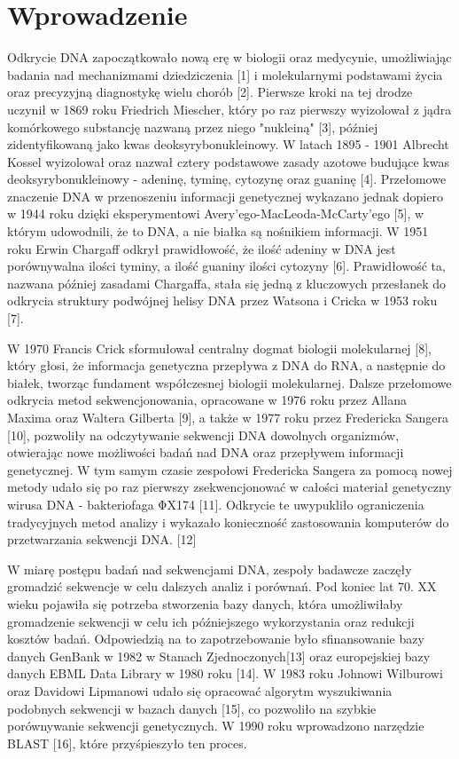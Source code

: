 \clearpage
\section{Wprowadzenie}

Odkrycie DNA zapoczątkowało nową erę w biologii oraz medycynie, umożliwiając badania
nad mechanizmami dziedziczenia [1] i molekularnymi podstawami życia oraz precyzyjną 
diagnostykę wielu chorób [2]. Pierwsze kroki na tej drodze uczynił w 1869 roku 
Friedrich Miescher, który po raz pierwszy wyizolował z jądra komórkowego substancję 
nazwaną przez niego "nukleiną" [3], później zidentyfikowaną jako kwas deoksyrybonukleinowy. 
W latach 1895 - 1901 Albrecht Kossel wyizolował oraz nazwał cztery podstawowe zasady 
azotowe budujące kwas deoksyrybonukleinowy - adeninę, tyminę, cytozynę oraz guaninę [4].
Przełomowe znaczenie DNA w przenoszeniu informacji genetycznej wykazano jednak dopiero 
w 1944 roku dzięki eksperymentowi Avery'ego-MacLeoda-McCarty'ego [5], w którym udowodnili, 
że to DNA, a nie białka są nośnikiem informacji. 
W 1951 roku Erwin Chargaff odkrył prawidłowość, że ilość adeniny w DNA jest porównywalna
ilości tyminy, a ilość guaniny ilości cytozyny [6]. Prawidłowość ta, nazwana później zasadami
Chargaffa, stała się jedną z kluczowych przesłanek do odkrycia struktury podwójnej helisy 
DNA przez Watsona i Cricka w 1953 roku [7].

W 1970 Francis Crick sformułował centralny dogmat biologii molekularnej [8], który głosi,
że informacja genetyczna przepływa z DNA do RNA, a następnie do białek, tworząc 
fundament współczesnej biologii molekularnej. Dalsze przełomowe odkrycia metod sekwencjonowania,
opracowane w 1976 roku przez Allana Maxima oraz Waltera Gilberta [9], a także w 1977 roku 
przez Fredericka Sangera [10], pozwoliły na odczytywanie sekwencji DNA dowolnych organizmów, 
otwierając nowe możliwości badań nad DNA oraz przepływem informacji genetycznej. 
W tym samym czasie zespołowi Fredericka Sangera za pomocą nowej metody udało się 
po raz pierwszy zsekwencjonować w całości materiał genetyczny wirusa DNA - 
bakteriofaga ΦX174 [11]. Odkrycie te uwypukliło ograniczenia tradycyjnych metod 
analizy i wykazało konieczność zastosowania komputerów do przetwarzania sekwencji DNA. [12]

W miarę postępu badań nad sekwencjami DNA, zespoły badawcze zaczęły gromadzić sekwencje 
w celu dalszych analiz i porównań. Pod koniec lat 70. XX wieku pojawiła się potrzeba 
stworzenia bazy danych, która umożliwiłaby gromadzenie sekwencji w celu ich późniejszego 
wykorzystania oraz redukcji kosztów badań. Odpowiedzią na to zapotrzebowanie było 
sfinansowanie bazy danych GenBank w 1982 w Stanach Zjednoczonych[13] oraz 
europejskiej bazy danych EBML Data Library w 1980 roku [14]. W 1983 roku 
Johnowi Wilburowi oraz Davidowi Lipmanowi udało się opracować algorytm wyszukiwania
podobnych sekwencji w bazach danych [15], co pozwoliło na szybkie porównywanie sekwencji 
genetycznych. W 1990 roku wprowadzono narzędzie BLAST [16], które przyśpieszyło ten 
proces.


